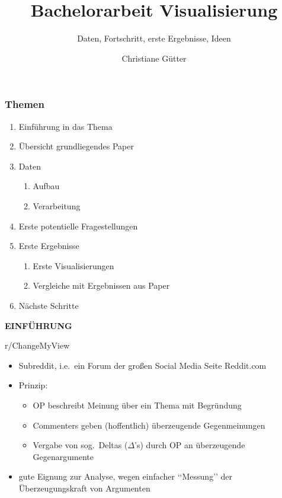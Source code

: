 \documentclass[compress,12pt]{beamer}
\title{Bachelorarbeit Visualisierung}
\subtitle{Daten, Fortschritt, erste Ergebnisse, Ideen}
\date{}
\author{Christiane Gütter}
\institute{Bauhaus Universität Weimar}
\begin{document}
    \frame[plain]{\titlepage}

    \begin{frame}[plain]
        \frametitle{Themen}
        \begin{enumerate}
            \item Einführung in das Thema
            \item Übersicht grundliegendes Paper
            \item Daten
            \begin{enumerate}
                \item Aufbau
                \item Verarbeitung
            \end{enumerate}
            \item Erste potentielle Fragestellungen
            \item Erste Ergebnisse
            \begin{enumerate}
                \item Erste Visualisierungen
                \item Vergleiche mit Ergebnissen aus Paper
            \end{enumerate}
            \item Nächste Schritte
        \end{enumerate}
    \end{frame}


    \begin{frame}
        \centering
        \textbf{EINFÜHRUNG}
    \end{frame}

    \begin{frame}{r/ChangeMyView}
        \begin{itemize}
            \item Subreddit, i.e.\ ein Forum der großen Social Media Seite Reddit.com
            \item Prinzip:
            \begin{itemize}
                \item OP beschreibt Meinung über ein Thema mit Begründung
                \item Commenters geben (hoffentlich) überzeugende Gegenmeinungen
                \item Vergabe von sog.\ Deltas ($\Delta$\rq{}s) durch OP an überzeugende Gegenargumente
            \end{itemize}
            \item gute Eignung zur Analyse, wegen einfacher \lq\lq{}Messung\rq\rq{} der Überzeugungskraft von Argumenten
        \end{itemize}
    \end{frame}
\end{document}
